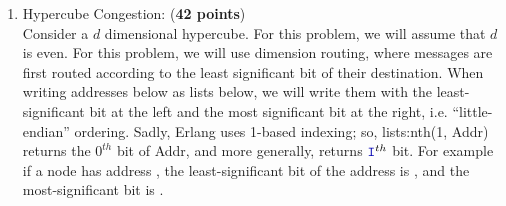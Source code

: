 \documentclass{article}
\begin{document}
\begin{enumerate}

    \item Hypercube Congestion: (\textbf{42 points})\label{q:congestion}\\
          Consider a $d$ dimensional hypercube.  For this problem, we will assume that $d$ is even.
          For this problem, we will use dimension routing, where messages are first routed according
          to the least significant bit of their destination.
          When writing addresses below as lists below, we will write them with the least-significant
          bit at the left and the most significant bit at the right, i.e. ``little-endian'' ordering.
          Sadly, Erlang uses 1-based indexing;
          so, lists:nth(1, Addr) returns the $0^{th}$ bit of Addr,
          and more generally,  returns $\code{I}^{th}$ bit.
          For example if a node has address \code{[0,1,0,1]},
          the least-significant bit of the address is ,
          and the most-significant bit is .


\end{enumerate}
\end{document}
